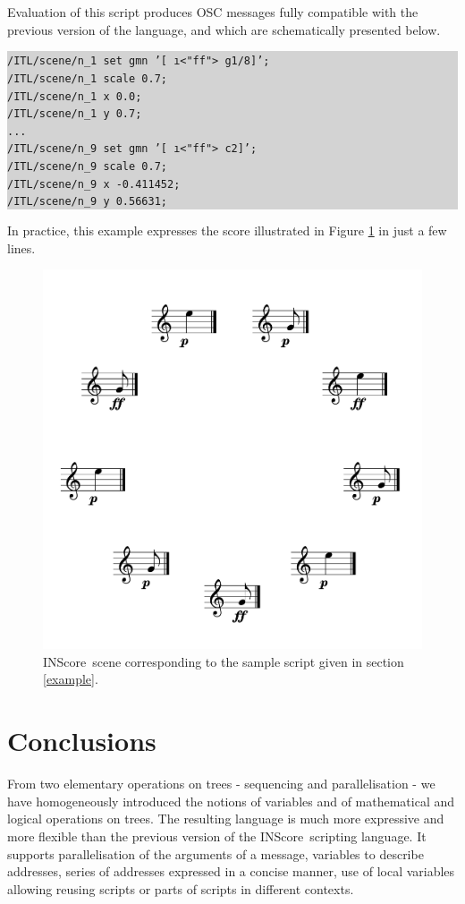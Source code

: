 \documentclass[runningheads]{llncs}
\newcommand{\IS}		{INScore}
\newcommand{\code}	[2][0.9]	{\vspace{0mm}\begin{center}\colorbox{lightgrey}{
							\begin{minipage}[t]{#1\columnwidth} 
							{\small \texttt{#2}}
							\end{minipage}}\end{center}}
\begin{document}
Evaluation of this script produces OSC messages fully compatible with the previous version of the language, and which are schematically presented below. 
\code[1]{/ITL/scene/n\_1 set gmn '[ \i<"ff"> g1/8]';\\
/ITL/scene/n\_1 scale 0.7;\\
/ITL/scene/n\_1 x 0.0;\\
/ITL/scene/n\_1 y 0.7;\\
...\\
/ITL/scene/n\_9 set gmn '[ \i<"ff"> c2]';\\
/ITL/scene/n\_9 scale 0.7;\\
/ITL/scene/n\_9 x -0.411452;\\
/ITL/scene/n\_9 y 0.56631;
}
In practice, this example expresses the score illustrated in Figure \ref{samplescene} in just a few lines.  
\begin{figure}[htbp]
\begin{center}
\includegraphics[width=0.69\columnwidth]{imgs/scene}
\caption{\IS\ scene corresponding to the sample script given in section \ref{example}.}
\label{samplescene}
\end{center}
\end{figure}

\section{Conclusions}
From two elementary operations on trees - sequencing and parallelisation - we have homogeneously introduced the notions of variables and of mathematical and logical operations on trees. The resulting language is much more expressive and more flexible than the  previous version of the \IS\ scripting language. 
It supports parallelisation of the arguments of a message, variables to describe addresses, series of addresses expressed in a concise manner, use of local variables allowing reusing scripts or parts of scripts in different contexts.




\end{document}
